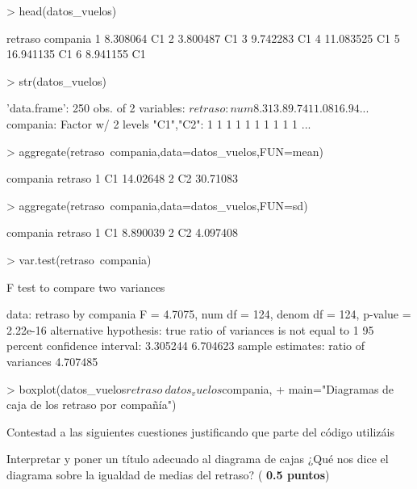 \documentclass[10pt]{article}
\newcounter{punts} \def\thepunts{\arabic{punts}}
\def\punt{\addtocounter{punts}{1} \smallskip{\emph{\thepunts) }}}
\begin{document}
\begin{Schunk}
\begin{Sinput}
> head(datos_vuelos)
\end{Sinput}
\begin{Soutput}
    retraso compania
1  8.308064       C1
2  3.800487       C1
3  9.742283       C1
4 11.083525       C1
5 16.941135       C1
6  8.941155       C1
\end{Soutput}
\begin{Sinput}
> str(datos_vuelos)
\end{Sinput}
\begin{Soutput}
'data.frame':	250 obs. of  2 variables:
 $ retraso : num  8.31 3.8 9.74 11.08 16.94 ...
 $ compania: Factor w/ 2 levels "C1","C2": 1 1 1 1 1 1 1 1 1 1 ...
\end{Soutput}
\begin{Sinput}
> aggregate(retraso~compania,data=datos_vuelos,FUN=mean)
\end{Sinput}
\begin{Soutput}
  compania  retraso
1       C1 14.02648
2       C2 30.71083
\end{Soutput}
\begin{Sinput}
> aggregate(retraso~compania,data=datos_vuelos,FUN=sd) 
\end{Sinput}
\begin{Soutput}
  compania  retraso
1       C1 8.890039
2       C2 4.097408
\end{Soutput}
\begin{Sinput}
> var.test(retraso~compania)
\end{Sinput}
\begin{Soutput}
	F test to compare two variances

data:  retraso by compania
F = 4.7075, num df = 124, denom df = 124, p-value = 2.22e-16
alternative hypothesis: true ratio of variances is not equal to 1
95 percent confidence interval:
 3.305244 6.704623
sample estimates:
ratio of variances 
          4.707485 
\end{Soutput}
\begin{Sinput}
> boxplot(datos_vuelos$retraso~datos_vuelos$compania,
+         main="Diagramas de caja de los retraso por compañía")
\end{Sinput}
\end{Schunk}


Contestad a las siguientes cuestiones justificando que parte del código utilizáis

\punt  Interpretar y poner un título adecuado al diagrama de cajas ¿Qué nos dice el diagrama sobre la igualdad de medias del retraso? (\textbf{ 0.5 puntos})
\end{document}
